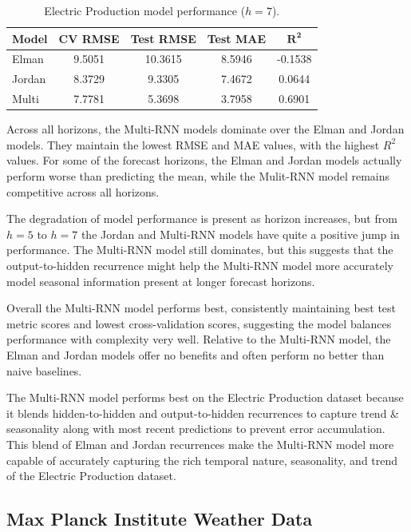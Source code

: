 \documentclass[conference]{IEEEtran}
\begin{document}
\begin{table}[H]
\centering
\caption{Electric Production model performance ($h=7$).}
\label{tab:ep_h7}
\begin{tabular}{lcccc}
\toprule
\textbf{Model} & \textbf{CV RMSE} & \textbf{Test RMSE} & \textbf{Test MAE} & $\mathbf{R^2}$ \\
\midrule
Elman  & 9.5051 & 10.3615 & 8.5946 & -0.1538 \\
Jordan & 8.3729 & 9.3305  & 7.4672 & 0.0644 \\
Multi  & 7.7781 & 5.3698  & 3.7958 & 0.6901 \\
\bottomrule
\end{tabular}
\end{table}

Across all horizons, the Multi-RNN models dominate over the Elman and Jordan models. They maintain the lowest RMSE and MAE values, with the highest $R^2$ values. For some of the forecast horizons, the Elman and Jordan models actually perform worse than predicting the mean, while the Mulit-RNN model remains competitive across all horizons.

The degradation of model performance is present as horizon increases, but from $h=5$ to $h=7$ the Jordan and Multi-RNN models have quite a positive jump in performance. The Multi-RNN model still dominates, but this suggests that the output-to-hidden recurrence might help the Multi-RNN model more accurately model seasonal information present at longer forecast horizons.

Overall the Multi-RNN model performs best, consistently maintaining best test metric scores and lowest cross-validation scores, suggesting the model balances performance with complexity very well. Relative to the Multi-RNN model, the Elman and Jordan models offer no benefits and often perform no better than naive baselines.

The Multi-RNN model performs best on the Electric Production dataset because it blends hidden-to-hidden and output-to-hidden recurrences to capture trend \& seasonality along with most recent predictions to prevent error accumulation. This blend of Elman and Jordan recurrences make the Multi-RNN model more capable of accurately capturing the rich temporal nature, seasonality, and trend of the Electric Production dataset.

\subsection{\textbf{Max Planck Institute Weather Data}}
\end{document}
